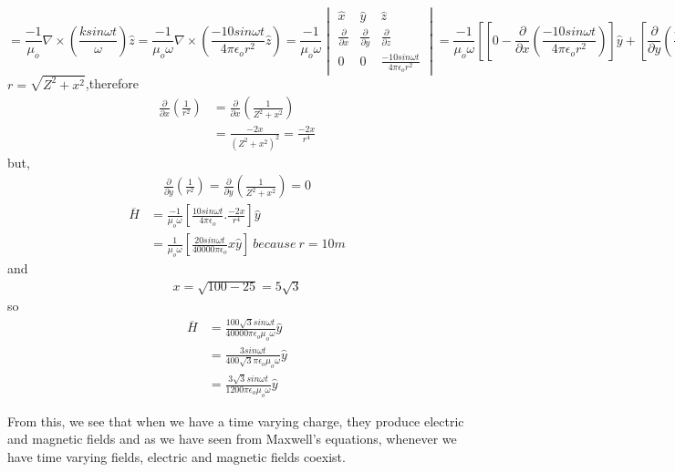 \begin{exmp}
\begin{dmath*}
= \frac{-1}{\mu_o} \nabla\times\left(\frac{ksin\omega t}{\omega} \right)\hat{z}
= \frac{-1}{\mu_o\omega}\nabla\times\left(\frac{-10sin\omega t}{4\pi\epsilon_o r^2} \hat{z}\right)=\frac{-1}{\mu_o\omega}\begin{vmatrix}
\hat{x} &\hat{y} &\hat{z}\\
\frac{\partial}{\partial x} & \frac{\partial}{\partial y} & \frac{\partial}{\partial z} \\
0 &0 &\frac{-10sin\omega t}{4\pi\epsilon_o r^2}
\end{vmatrix}
= \frac{-1}{\mu_o\omega}\left[\left[  0 - \frac{\partial}{\partial x}\left( \frac{-10sin\omega t}{4\pi \epsilon_o r^2}\right)  \right]\hat{y} + \left[ \frac{\partial}{\partial y}\left(\frac{-10sin\omega t}{4 \pi\epsilon_o r^2} \right)\hat{x}\right]\right] 
\end{dmath*}
$r = \sqrt{Z^2 + x^2}$,therefore
\begin{align*}
\frac{\partial }{\partial x}\left(\frac{1}{r^2} \right) &=  \frac{\partial }{\partial x}\left(\frac{1}{Z^2 + x^2} \right)\\
&= \frac{-2x}{(Z^2 + x^2)^2} = \frac{-2x}{r^4} 
\end{align*}
but,
\begin{align*}
\frac{\partial}{\partial y}\left(\frac{1}{r^2} \right) = \frac{\partial}{\partial y}\left(\frac{1}{Z^2 + x^2} \right) = 0  
\end{align*}
\begin{align*}
\overline{H} &= \frac{-1}{\mu_o\omega}\left[ \frac{10sin\omega t}{4\pi\epsilon_o}.\frac{-2x}{r^4}\right]\hat{y} \\
&= \frac{1}{\mu_o\omega}\left[ \frac{20sin\omega t}{40000\pi\epsilon_o}x\hat{y}\right] \ because\ r = 10m 
\end{align*}
and
\begin{align*}
x = \sqrt{100 - 25} = 5\sqrt{3}
\end{align*}
so
\begin{align*}
\overline{H} &=  \frac{100\sqrt{3}sin\omega t}{40000\pi\epsilon_o\mu_o\omega}\hat{y}\\
&= \frac{3sin\omega t}{400\sqrt{3}\pi\epsilon_o\mu_o\omega}\hat{y} \\
&= \frac{3\sqrt{3}sin\omega t}{1200\pi\epsilon_o\mu_o\omega}\hat{y}
\end{align*}
\end{exmp}

From this, we see that when we have a time varying charge, they produce electric and magnetic fields and as we have seen from Maxwell's equations, whenever we have time varying fields, electric and magnetic fields coexist.

